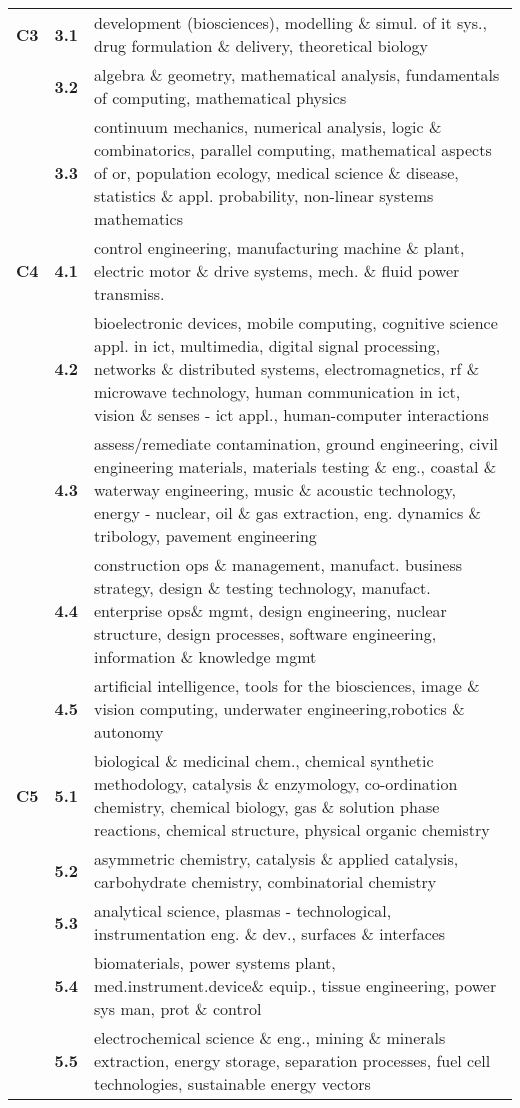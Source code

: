 \begin{spacing}{0.9}
\begin{longtable}[r]{r|r|p{11.5cm}}
\hline
\textbf{C3}
& \textbf{3.1} & {development (biosciences), modelling \& simul. of it sys., drug formulation \& delivery, theoretical biology}\\
& \textbf{3.2} & {algebra \& geometry, mathematical analysis, fundamentals of computing, mathematical physics}\\
& \textbf{3.3} & {continuum mechanics, numerical analysis, logic \& combinatorics, parallel computing, mathematical aspects of or, population ecology, medical science \& disease, statistics \& appl. probability, non-linear systems mathematics}\\
\hline
\textbf{C4}
& \textbf{4.1} & {control engineering, manufacturing machine \& plant, electric motor \& drive systems, mech. \& fluid power transmiss.}\\
& \textbf{4.2} & {bioelectronic devices, mobile computing, cognitive science appl. in ict, multimedia, digital signal processing, networks \& distributed systems, electromagnetics, rf \& microwave technology, human communication in ict, vision \& senses - ict appl., human-computer interactions}\\
& \textbf{4.3} & {assess/remediate contamination, ground engineering, civil engineering materials, materials testing \& eng., coastal \& waterway engineering, music \& acoustic technology, energy - nuclear, oil \& gas extraction, eng. dynamics \& tribology, pavement engineering}\\
& \textbf{4.4} & {construction ops \& management, manufact. business strategy, design \& testing technology, manufact. enterprise ops\& mgmt, design engineering, nuclear structure, design processes, software engineering, information \& knowledge mgmt}\\
& \textbf{4.5} & {artificial intelligence, tools for the biosciences, image \& vision computing, underwater engineering,robotics \& autonomy}\\
\hline
\textbf{C5}
& \textbf{5.1} & {biological \& medicinal chem., chemical synthetic methodology, catalysis \& enzymology, co-ordination chemistry, chemical biology, gas \& solution phase reactions, chemical structure, physical organic chemistry}\\
& \textbf{5.2} & {asymmetric chemistry, catalysis \& applied catalysis, carbohydrate chemistry, combinatorial chemistry}\\
& \textbf{5.3} & {analytical science, plasmas - technological, instrumentation eng. \& dev., surfaces \& interfaces}\\
& \textbf{5.4} & {biomaterials, power systems plant, med.instrument.device\& equip., tissue engineering, power sys man, prot \& control}\\
& \textbf{5.5} & {electrochemical science \& eng., mining \& minerals extraction, energy storage, separation processes, fuel cell technologies, sustainable energy vectors}
\end{longtable}
\end{spacing}

